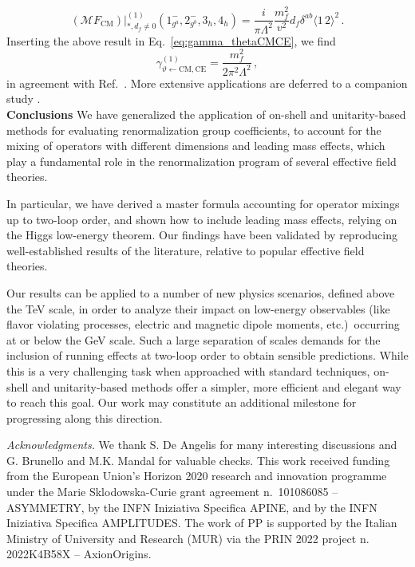 \documentclass[prl,twocolumn,twoside,preprintnumbers,superscriptaddress, nofootinbib]{revtex4-2}
\newcommand{\agl}[2]{\langle#1\, #2 \rangle}
\begin{document}
%
\begin{equation}
    (\mathcal M F_{\text{CM}})|_{*,d_f\neq 0}^{(1)}(1^-_{g^a},2^-_{g^b},3_h,4_h) = 
    \frac{i}{\pi\Lambda^2}\frac{m_f^2}{v^2}d_f\delta^{ab} \agl{1}{2}^2\,.
\end{equation}
%
Inserting the above result in Eq.~\eqref{eq:gamma_thetaCMCE}, 
we find
%
\begin{equation}
    \gamma^{(1)}_{\vartheta\leftarrow \text{CM},\text{CE}} = \frac{m_f^2}{2\pi^2\Lambda^2}\,,
\end{equation}
%
in agreement with Ref.~\cite{Jenkins:2017dyc}.
More extensive applications are deferred to a companion study \cite{Bresciani:longpaper}. \\

{\bf Conclusions}
We have generalized the application of on-shell and unitarity-based methods for evaluating renormalization group coefficients, to account for the mixing of operators with different dimensions and leading mass effects, which play a fundamental role in the renormalization program of several effective field theories. 

In particular, we have derived a master formula accounting for operator 
mixings up to two-loop order, and shown how to include leading mass effects,
relying on the Higgs low-energy theorem. Our findings have been validated by reproducing well-established results of the literature, relative to popular effective field theories.

Our results can be applied to a number of new physics scenarios, 
defined above the TeV scale, in order to analyze their impact on 
low-energy observables (like flavor violating processes, 
electric and magnetic dipole moments, etc.)~occurring at or 
below the GeV scale.
Such a large separation of scales demands for the inclusion of 
running effects at two-loop order to obtain sensible predictions. 
While this is a very challenging task when approached with standard techniques, 
on-shell and unitarity-based methods offer a simpler, more efficient 
and elegant way to reach this goal. 
Our work may constitute an additional milestone for progressing along this direction.

\vspace{5pt}

{\it Acknowledgments.} 
We thank S. De Angelis for many interesting discussions
and G. Brunello and M.K. Mandal for valuable checks.
This work received funding from the European Union’s Horizon 2020 research and innovation programme under the Marie Sklodowska-Curie grant agreement n.~101086085 – ASYMMETRY, 
by the INFN Iniziativa Specifica APINE, and by the INFN Iniziativa Specifica AMPLITUDES. The work of PP is supported by the Italian Ministry of University and Research (MUR) via the PRIN 2022 project n. 2022K4B58X – AxionOrigins.
\end{document}
